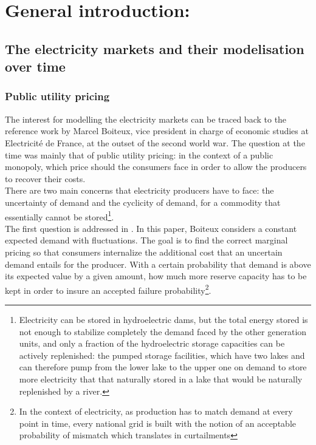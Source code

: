 \renewcommand{\thesection}{\arabic{chapter}.\arabic{section}}

\chapter*{General introduction: }
\label{chap:intro}
\cleardoublepage
\doublespacing

\section{The electricity markets and their modelisation over time}
\subsection{Public utility pricing}

The interest for modelling the electricity markets can be traced back to the reference work by Marcel Boiteux, vice president in charge of economic studies at Electricité de France, at the outset of the second world war. The question at the time was mainly that of public utility pricing: in the context of a public monopoly, which price should the consumers face in order to allow the producers to recover their costs. \\

There are two main concerns that electricity producers have to face: the uncertainty of demand and the cyclicity of demand, for a commodity that essentially cannot be stored\footnote{Electricity can be stored in hydroelectric dams, but the total energy stored is not enough to stabilize completely the demand faced by the other generation units, and only a fraction of the hydroelectric storage capacities can be actively replenished: the pumped storage facilities, which have two lakes and can therefore pump from the lower lake to the upper one on demand to store more electricity that that naturally stored in a lake that would be naturally replenished by a river.}. \\

The first question is addressed in \cite{boiteux1951tarification}. In this paper, Boiteux considers a constant expected demand with fluctuations. The goal is to find the correct marginal pricing so that consumers internalize the additional cost that an uncertain demand entails for the producer. With a certain probability that demand is above its expected value by a given amount, how much more reserve capacity has to be kept in order to insure an accepted failure probability\footnote{In the context of electricity, as production has to match demand at every point in time, every national grid is built with the notion of an acceptable probability of mismatch which translates in curtailments}.\\

